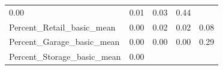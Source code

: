 \documentclass[]{article}
\begin{document}
\begin{longtable}[]{@{}lllll@{}}
\begin{minipage}[t]{0.08\columnwidth}
0.00\strut
\end{minipage} & \begin{minipage}[t]{0.09\columnwidth}\raggedright\strut
0.01\strut
\end{minipage} & \begin{minipage}[t]{0.09\columnwidth}\raggedright\strut
0.03\strut
\end{minipage} & \begin{minipage}[t]{0.11\columnwidth}\raggedright\strut
0.44\strut
\end{minipage}\tabularnewline
\begin{minipage}[t]{0.49\columnwidth}\raggedright\strut
Percent\_Retail\_basic\_mean\strut
\end{minipage} & \begin{minipage}[t]{0.08\columnwidth}\raggedright\strut
0.00\strut
\end{minipage} & \begin{minipage}[t]{0.09\columnwidth}\raggedright\strut
0.02\strut
\end{minipage} & \begin{minipage}[t]{0.09\columnwidth}\raggedright\strut
0.02\strut
\end{minipage} & \begin{minipage}[t]{0.11\columnwidth}\raggedright\strut
0.08\strut
\end{minipage}\tabularnewline
\begin{minipage}[t]{0.49\columnwidth}\raggedright\strut
Percent\_Garage\_basic\_mean\strut
\end{minipage} & \begin{minipage}[t]{0.08\columnwidth}\raggedright\strut
0.00\strut
\end{minipage} & \begin{minipage}[t]{0.09\columnwidth}\raggedright\strut
0.00\strut
\end{minipage} & \begin{minipage}[t]{0.09\columnwidth}\raggedright\strut
0.00\strut
\end{minipage} & \begin{minipage}[t]{0.11\columnwidth}\raggedright\strut
0.29\strut
\end{minipage}\tabularnewline
\begin{minipage}[t]{0.49\columnwidth}\raggedright\strut
Percent\_Storage\_basic\_mean\strut
\end{minipage} & \begin{minipage}[t]{0.08\columnwidth}\raggedright\strut
0.00\strut
\end{minipage} & \begin{minipage}[t]{0.09\columnwidth}\raggedright\strut

\end{minipage}
\end{longtable}
\end{document}
